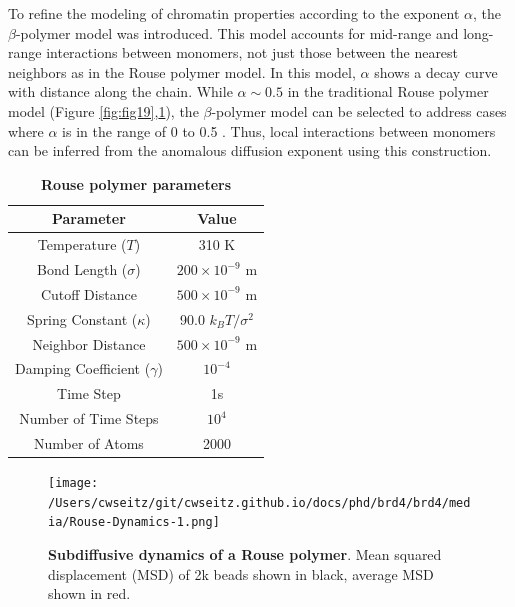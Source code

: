To refine the modeling of chromatin properties according to the exponent $\alpha$, the $\beta$-polymer model was introduced. This model accounts for mid-range and long-range interactions between monomers, not just those between the nearest neighbors as in the Rouse polymer model. In this model, $\alpha$ shows a decay curve with distance along the chain. While $\alpha \sim 0.5$ in the traditional Rouse polymer model (Figure \ref{fig:fig19},\ref{fig:fig20}), the $\beta$-polymer model can be selected to address cases where $\alpha$ is in the range of 0 to 0.5 \parencite{Amitai2013,Amitai2017,Hajjoul2013}. Thus, local interactions between monomers can be inferred from the anomalous diffusion exponent using this construction.

\begin{table}[h!]
\centering
\begin{tabular}{|c|c|}
\hline
\textbf{Parameter} & \textbf{Value} \\ \hline
Temperature ($T$) & 310 K \\ \hline
Bond Length ($\sigma$) & $200 \times 10^{-9}$ m \\ \hline
Cutoff Distance & $500 \times 10^{-9}$ m \\ \hline
Spring Constant ($\kappa$) & 90.0 $k_{B}T/\sigma^2$ \\ \hline
Neighbor Distance & $500 \times 10^{-9}$ m \\ \hline
Damping Coefficient ($\gamma$) & $10^{-4}$ \\ \hline
Time Step & 1s\\ \hline
Number of Time Steps & $10^4$ \\ \hline
Number of Atoms & 2000 \\ \hline
\end{tabular}
\caption{\textbf{Rouse polymer parameters}}
\end{table}

\begin{figure}[t]
\centering
\texttt{[image: /Users/cwseitz/git/cwseitz.github.io/docs/phd/brd4/brd4/media/Rouse-Dynamics-1.png]}
\caption{\textbf{Subdiffusive dynamics of a Rouse polymer}.  Mean squared displacement (MSD) of 2k beads shown in black, average MSD shown in red.}
\label{fig:fig20}
\end{figure}


